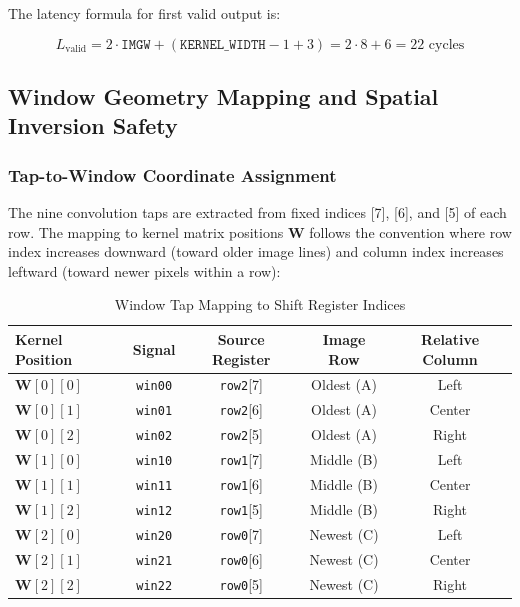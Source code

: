 \documentclass[11pt,a4paper]{report}
\begin{document}
The latency formula for first valid output is:

$$
L_{\mathrm{valid}} = 2 \cdot \mathtt{IMGW} + (\mathtt{KERNEL\_WIDTH} - 1 + 3) = 2 \cdot 8 + 6 = 22 \text{ cycles}
$$

\subsection{Window Geometry Mapping and Spatial Inversion Safety}

\subsubsection{Tap-to-Window Coordinate Assignment}

The nine convolution taps are extracted from fixed indices [7], [6], and [5] of each row. The mapping to kernel matrix positions $\mathbf{W}$ follows the convention where row index increases downward (toward older image lines) and column index increases leftward (toward newer pixels within a row):

\begin{table}[htbp]
\centering
\caption{Window Tap Mapping to Shift Register Indices}
\begin{tabular}{@{}lcccc@{}}
\toprule
\textbf{Kernel Position} & \textbf{Signal} & \textbf{Source Register} & \textbf{Image Row} & \textbf{Relative Column} \\
\midrule
$\mathbf{W}[0][0]$ & \texttt{win00} & \texttt{row2}[7] & Oldest (A) & Left \\
$\mathbf{W}[0][1]$ & \texttt{win01} & \texttt{row2}[6] & Oldest (A) & Center \\
$\mathbf{W}[0][2]$ & \texttt{win02} & \texttt{row2}[5] & Oldest (A) & Right \\
\midrule
$\mathbf{W}[1][0]$ & \texttt{win10} & \texttt{row1}[7] & Middle (B) & Left \\
$\mathbf{W}[1][1]$ & \texttt{win11} & \texttt{row1}[6] & Middle (B) & Center \\
$\mathbf{W}[1][2]$ & \texttt{win12} & \texttt{row1}[5] & Middle (B) & Right \\
\midrule
$\mathbf{W}[2][0]$ & \texttt{win20} & \texttt{row0}[7] & Newest (C) & Left \\
$\mathbf{W}[2][1]$ & \texttt{win21} & \texttt{row0}[6] & Newest (C) & Center \\
$\mathbf{W}[2][2]$ & \texttt{win22} & \texttt{row0}[5] & Newest (C) & Right \\
\bottomrule
\end{tabular}
\end{table}
\end{document}
